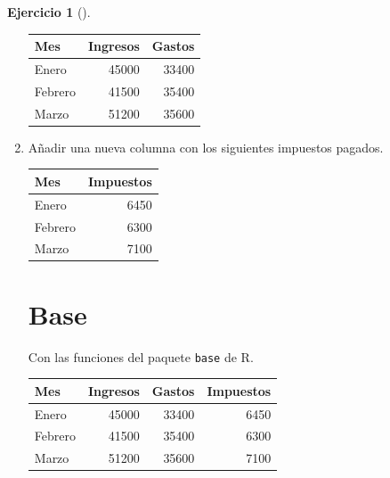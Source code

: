 \documentclass[
  spanish,
  a4paper,
]{scrreport}
\newenvironment{Shaded}{\begin{snugshade}}{\end{snugshade}}
\newcommand{\DecValTok}[1]{\textcolor[rgb]{0.68,0.00,0.00}{#1}}
\newcommand{\FunctionTok}[1]{\textcolor[rgb]{0.28,0.35,0.67}{#1}}
\newcommand{\NormalTok}[1]{\textcolor[rgb]{0.00,0.23,0.31}{#1}}
\newcommand{\OtherTok}[1]{\textcolor[rgb]{0.00,0.23,0.31}{#1}}
\newcommand{\SpecialCharTok}[1]{\textcolor[rgb]{0.37,0.37,0.37}{#1}}
\theoremstyle{definition}
\newtheorem{exercise}{Ejercicio}[chapter]
\theoremstyle{remark}
\begin{document}
\begin{exercise}[]
\begin{enumerate}
\begin{tcolorbox}
  \begin{longtable}[]{@{}lrr@{}}
  \toprule\noalign{}
  Mes & Ingresos & Gastos \\
  \midrule\noalign{}
  \endhead
  \bottomrule\noalign{}
  \endlastfoot
  Enero & 45000 & 33400 \\
  Febrero & 41500 & 35400 \\
  Marzo & 51200 & 35600 \\
  \end{longtable}

  \end{tcolorbox}
\item
  Añadir una nueva columna con los siguientes impuestos pagados.

  \begin{longtable}[]{@{}lr@{}}
  \toprule\noalign{}
  Mes & Impuestos \\
  \midrule\noalign{}
  \endhead
  \bottomrule\noalign{}
  \endlastfoot
  Enero & 6450 \\
  Febrero & 6300 \\
  Marzo & 7100 \\
  \end{longtable}

  \begin{tcolorbox}[enhanced jigsaw, colback=white, coltitle=black, toprule=.15mm, rightrule=.15mm, opacitybacktitle=0.6, opacityback=0, bottomtitle=1mm, toptitle=1mm, titlerule=0mm, breakable, leftrule=.75mm, title=\textcolor{quarto-callout-tip-color}{\faLightbulb}\hspace{0.5em}{Solución}, arc=.35mm, left=2mm, bottomrule=.15mm, colframe=quarto-callout-tip-color-frame, colbacktitle=quarto-callout-tip-color!10!white]

  \section{Base}

  Con las funciones del paquete \texttt{base} de R.

\begin{Shaded}
\end{Shaded}

  \begin{longtable}[]{@{}lrrr@{}}
  \toprule\noalign{}
  Mes & Ingresos & Gastos & Impuestos \\
  \midrule\noalign{}
  \endhead
  \bottomrule\noalign{}
  \endlastfoot
  Enero & 45000 & 33400 & 6450 \\
  Febrero & 41500 & 35400 & 6300 \\
  Marzo & 51200 & 35600 & 7100 \\
  \end{longtable}


\end{tcolorbox}
\end{enumerate}
\end{exercise}
\end{document}
